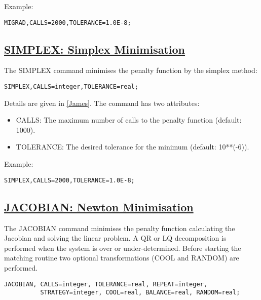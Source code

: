 Example: 
\begin{verbatim}
MIGRAD,CALLS=2000,TOLERANCE=1.0E-8;
\end{verbatim}

\subsection{\href{simplex}{SIMPLEX: Simplex Minimisation}}
The SIMPLEX command minimises the penalty function by the simplex method: 

\begin{verbatim}
SIMPLEX,CALLS=integer,TOLERANCE=real;
\end{verbatim}

Details are given in \href{bibliography.html#minuit}{[James]}. The command has two attributes: 
\begin{itemize}
   \item CALLS: The maximum number of calls to the penalty function (default: 1000). 
   \item TOLERANCE: The desired tolerance for the minimum (default: 10**(-6)). 
\end{itemize} 

Example: 
\begin{verbatim}
SIMPLEX,CALLS=2000,TOLERANCE=1.0E-8;
\end{verbatim}

\subsection{\href{jacobian}{JACOBIAN: Newton Minimisation}}
The JACOBIAN command minimises the penalty function calculating the
Jacobian and solving the linear problem. A QR or LQ  decomposition is
performed when the system is over or under-determined. Before starting
the matching routine two optional transformations (COOL and RANDOM) are
performed.      

\begin{verbatim}
JACOBIAN, CALLS=integer, TOLERANCE=real, REPEAT=integer, 
          STRATEGY=integer, COOL=real, BALANCE=real, RANDOM=real;
\end{verbatim}


